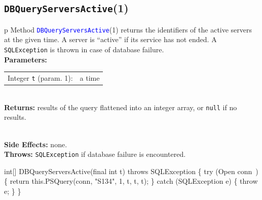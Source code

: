 \subsection{\texttt{DBQueryServersActive}(1)}
\begin{tabular}{p{\textwidth}}
\toprule
{}
Method \textcolor{blue}{{\tt{}\protect{}DBQueryServersActive}}(1) returns the identifiers
of the active servers at the given time. A server is ``active'' if its
service has not ended.
A {\tt{}SQLException} is thrown in case of database failure.\\
\midrule
\textbf{Parameters:} \\
\begin{tabular}{lp{116mm}}
Integer {\tt{}t} (param. 1):&a time
\end{tabular}\\
\textbf{Returns:} results of the query flattened into an integer array, or
{\tt{}null} if no results.

\\
\textbf{Side Effects:} none.\\
\textbf{Throws:} {\tt{}SQLException} if database failure is encountered.\\
\bottomrule
\end{tabular}
\nwenddocs{}\endmoddef{}
int[] DBQueryServersActive(final int t) throws SQLException \{
  try (\LA{}Open \code{}conn\edoc{}~{\nwtagstyle{}}\RA{}) \{
    return this.PSQuery(conn, "S134", 1, t, t, t);
  \} catch (SQLException e) \{
    throw e;
  \}
\}
\eatline
{}\nwendcode{}\endmoddef{}

